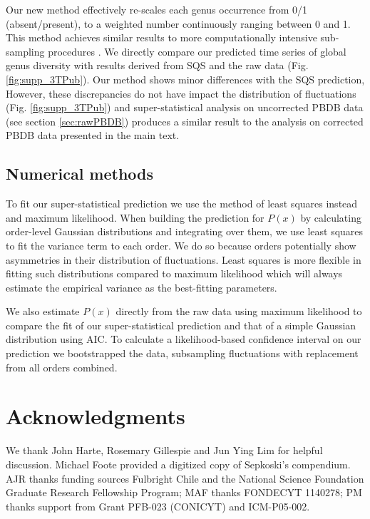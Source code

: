 \documentclass[12pt]{article}
\let\citep=\autocite
\begin{document}
Our new method effectively re-scales each genus occurrence from 0/1
(absent/present), to a weighted number continuously ranging between 0
and 1.  This method achieves similar results to more computationally
intensive sub-sampling procedures \citep{alroy08, alroy2010}. We
directly compare our predicted time series of global genus diversity
with results derived from SQS \citep{alroy2010} and the raw data
(Fig. \ref{fig:supp_3TPub}).  Our method shows minor differences with
the SQS prediction, However, these discrepancies do not have impact
the distribution of fluctuations (Fig. \ref{fig:supp_3TPub}) and
super-statistical analysis on uncorrected PBDB data (see section
\ref{sec:rawPBDB}) produces a similar result to the analysis on
corrected PBDB data presented in the main text.

\subsection{Numerical methods} \label{sec:numMeth} To fit our
super-statistical prediction we use the method of least squares
instead and maximum likelihood. When building the prediction for
$P(x)$ by calculating order-level Gaussian distributions and
integrating over them, we use least squares to fit the variance term
to each order. We do so because orders potentially show asymmetries in
their distribution of fluctuations. Least squares is more flexible in
fitting such distributions compared to maximum likelihood which will
always estimate the empirical variance as the best-fitting parameters.

We also estimate $P(x)$ directly from the raw data using maximum
likelihood to compare the fit of our super-statistical prediction and
that of a simple Gaussian distribution using AIC. To calculate a
likelihood-based confidence interval on our prediction we bootstrapped
the data, subsampling fluctuations with replacement from all orders
combined.

\section*{Acknowledgments}
We thank John Harte, Rosemary Gillespie and Jun Ying Lim for helpful
discussion. Michael Foote provided a digitized copy of Sepkoski's
compendium. AJR thanks funding sources Fulbright Chile and the
National Science Foundation Graduate Research Fellowship Program; MAF
thanks FONDECYT 1140278; PM thanks support from Grant PFB-023
(CONICYT) and ICM-P05-002.
\end{document}
